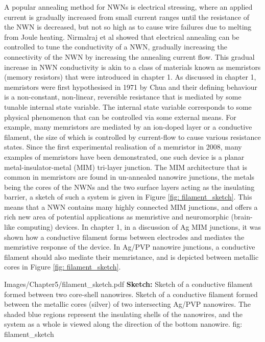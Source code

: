 A popular annealing method for NWNs is electrical stressing\cite{rocha2015,bellew2015}, where an applied current is gradually increased from small current ranges until the resistance of the NWN is decreased, but not so high as to cause wire failures due to melting from Joule heating\cite{lagrange2016,zhao2011}. Nirmalraj et al showed that electrical annealing can be controlled to tune the conductivity of a NWN, gradually increasing the connectivity of the NWN by increasing the annealing current flow\cite{nirmalraj2012}. This gradual increase in NWN conductivity is akin to a class of materials known as memristors (memory resistors) that were introduced in chapter 1. As discussed in chapter 1, memristors were first hypothesised in 1971 by Chua and their defining behaviour is a non-constant, non-linear, reversible resistance that is mediated by some tunable internal state variable\cite{chua1971}. The internal state variable corresponds to some physical phenomenon that can be controlled via some external means. For example, many memristors are mediated by an ion-doped layer or a conductive filament, the size of which is controlled by current-flow to cause various resistance states\cite{strukov2008,waser2007,valov2011}. Since the first experimental realisation of a memristor in 2008\cite{strukov2008}, many examples of memristors have been demonstrated, one such device is a planar metal-insulator-metal (MIM) tri-layer junction. The MIM architecture that is common in memristors are found in un-annealed nanowire junctions, the metals being the cores of the NWNs and the two surface layers acting as the insulating barrier, a sketch of such a system is given in Figure \ref{fig: filament_sketch}. This means that a NWN contains many highly connected MIM junctions, and offers a rich new area of potential applications as memristive and neuromorphic (brain-like computing) devices. In chapter 1, in a discussion of Ag MIM junctions, it was shown how a conductive filament forms between electrodes and mediates the memristive response of the device\cite{yang2012}. In Ag/PVP nanowire junctions, a conductive filament should also mediate their memristance\cite{scaling2018}, and is depicted between metallic cores in Figure \ref{fig: filament_sketch}.

{Images/Chapter5/filament_sketch.pdf}
{\textbf{Sketch:} Sketch of a conductive filament formed between two core-shell nanowires.}
{Sketch of a conductive filament formed between the metallic cores (silver) of two intersecting Ag/PVP nanowires. The shaded blue regions represent the insulating shells of the nanowires, and the system as a whole is viewed along the direction of the bottom nanowire.}
{fig: filament_sketch}

